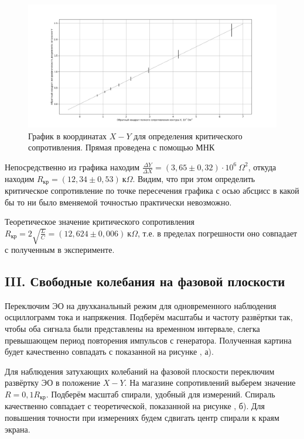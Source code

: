 \documentclass[a4paper,10pt]{article}
\begin{document}
\begin{figure}[h]
	\centering
	\includegraphics[scale=0.33]{ddecr}
	\caption{График в координатах $X-Y$ для определения критического сопротивления. Прямая проведена с помощью МНК} \label{ddecr}
\end{figure}

Непосредственно из графика находим $\frac{\Delta Y}{\Delta X}=\left(3,65\pm0,32\right)\cdot10^6~\Omega^2$, откуда находим $R_{\text{кр}}=\left(12,34\pm0,53\right)~\text{к}\Omega$. Видим, что при этом определить критическое сопротивление по точке пересечения графика с осью абсцисс в какой бы то ни было вменяемой точностью практически невозможно.

Теоретическое значение критического сопротивления $R_{\text{кр}}=2\sqrt{\frac{L}{C}}=\left(12,624\pm0,006\right)~\text{к}\Omega$, т.е. в пределах погрешности оно совпадает с полученным в эксперименте.

\subsection*{III. Свободные колебания на фазовой плоскости}

Переключим ЭО на двухканальный режим для одновременного наблюдения осциллограмм тока и напряжения. Подберём масштабы и частоту развёртки так, чтобы оба сигнала были представлены на временном интервале, слегка превышающем период повторения импульсов с генератора. Полученная картина будет качественно совпадать с показанной на рисунке , а).

Для наблюдения затухающих колебаний на фазовой плоскости переключим развёртку ЭО в положение $X-Y$. На магазине сопротивлений выберем значение $R=0,1R_{\text{кр}}$. Подберём масштаб спирали, удобный для измерений. Спираль качественно совпадает с теоретической, показанной на рисунке , б). Для повышения точности при измерениях будем сдвигать центр спирали к краям экрана.
\end{document}
